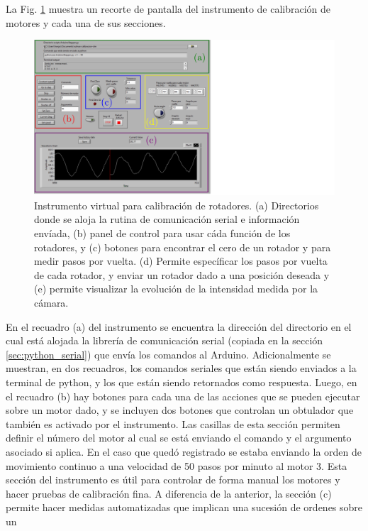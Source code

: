 La Fig. \ref{fig:polarizer_calib} muestra un recorte de
pantalla del instrumento de calibración de motores y cada una de sus secciones.
\begin{figure}
\centering
\includegraphics[scale = .5]{polarizer_calib.pdf} 
\caption[Interfaz del programa para calibración de
motores.]{Instrumento virtual para calibración de rotadores. (a)
  Directorios donde se aloja la rutina de comunicación serial e
  información envíada, (b) panel de control para usar cáda función de
  los rotadores, y (c) botones para encontrar el cero de un rotador y
  para medir pasos por vuelta. (d) Permite específicar los pasos por
  vuelta de cada rotador, y enviar un rotador dado a una posición
  deseada y (e) permite visualizar la evolución de la intensidad
  medida por la cámara. }
\label{fig:polarizer_calib}
\end{figure}
En el recuadro (a) del instrumento se encuentra la dirección del
directorio en el cual está alojada la librería de comunicación serial
(copiada en la sección \ref{sec:python_serial})
que envía los comandos al Arduino. Adicionalmente se muestran, en dos
recuadros, los comandos seriales que están siendo enviados a la
terminal de python, y los que están siendo retornados como respuesta.
Luego, en el recuadro (b) hay botones para cada una de las acciones que
se pueden ejecutar sobre un motor dado, y se incluyen dos botones que
controlan un obtulador que también es activado por el
instrumento. Las casillas de esta sección 
permiten definir el número del motor al cual se está enviando el
comando y el argumento asociado si aplica. En el caso que quedó
registrado se estaba enviando la orden de movimiento continuo a una
velocidad de 50 pasos por minuto al motor 3. Esta sección del instrumento es útil para
controlar de forma manual los motores y hacer pruebas de calibración
fina. A diferencia de la anterior, la sección (c) permite hacer
medidas automatizadas que implican una sucesión de ordenes sobre un
